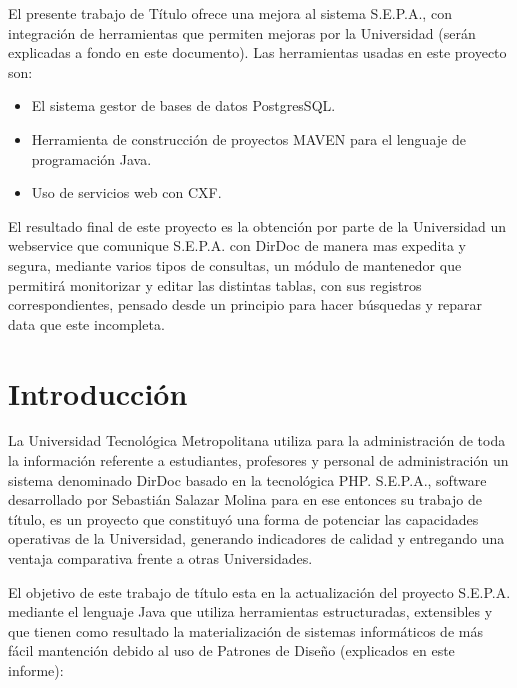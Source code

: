 \documentclass[a4paper,12pt,openany,oneside]{book}
\begin{document}

El presente trabajo de Título ofrece una mejora al sistema S.E.P.A., con integración de herramientas que permiten mejoras por la Universidad (serán explicadas a fondo en este documento). Las herramientas usadas en este proyecto son: 

\begin{itemize}
	\item El sistema gestor de bases de datos PostgresSQL.
	\item Herramienta de construcción de proyectos MAVEN para el lenguaje de programación Java.
	\item Uso de servicios web con CXF.
\end{itemize}

El resultado final de este proyecto es la obtención por parte de la Universidad un webservice que comunique S.E.P.A. con DirDoc de manera mas expedita y segura, mediante varios tipos de consultas, un módulo de mantenedor que permitirá monitorizar y editar las distintas tablas, con sus registros correspondientes, pensado desde un principio para hacer búsquedas y reparar data que este incompleta.

\tableofcontents
\chapter*{Introducción}
\thispagestyle{empty}
La Universidad Tecnológica Metropolitana utiliza para la administración de toda la información referente a estudiantes, profesores y personal de administración un sistema denominado DirDoc basado en la tecnológica PHP. S.E.P.A., software desarrollado por Sebastián Salazar Molina para en ese entonces su trabajo de título, es un proyecto que constituyó una forma de potenciar las capacidades operativas de la Universidad, generando indicadores de calidad y entregando una ventaja comparativa frente a otras Universidades.

El objetivo de este trabajo de título esta en la actualización del proyecto S.E.P.A. mediante el lenguaje Java que utiliza herramientas estructuradas, extensibles y que tienen como resultado la materialización de sistemas informáticos de más fácil mantención debido al uso de Patrones de Diseño (explicados en este informe):
\end{document}
